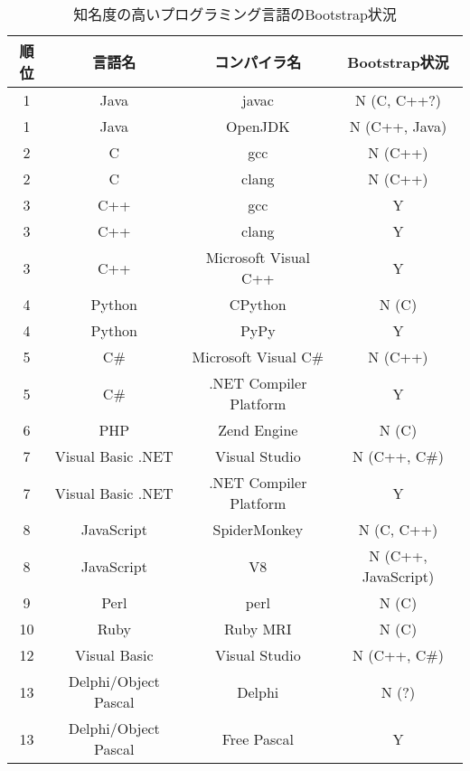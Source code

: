 \begin{table}[hb]
    \begin{center}
        \caption{知名度の高いプログラミング言語のBootstrap状況}
        \begin{tabular}{|c|c|c|c|}
            \hline
            順位 & 言語名 & コンパイラ名 & Bootstrap状況 \\
            \hline
            1 & Java & javac & N (C, C++?) \\
            \hline
            1 & Java & OpenJDK & N (C++, Java) \\
            \hline
            2 & C & gcc & N (C++) \\
            \hline
            2 & C & clang & N (C++) \\
            \hline
            3 & C++ & gcc & Y \\
            \hline
            3 & C++ & clang & Y \\
            \hline
            3 & C++ & Microsoft Visual C++ & Y \\
            \hline
            4 & Python & CPython & N (C) \\
            \hline
            4 & Python & PyPy & Y \\
            \hline
            5 & C\# & Microsoft Visual C\# & N (C++) \\
            \hline
            5 & C\# & .NET Compiler Platform & Y \\
            \hline
            6 & PHP & Zend Engine & N (C) \\
            \hline
            7 & Visual Basic .NET & Visual Studio & N (C++, C\#) \\
            \hline
            7 & Visual Basic .NET & .NET Compiler Platform & Y \\
            \hline
            8 & JavaScript & SpiderMonkey & N (C, C++) \\
            \hline
            8 & JavaScript & V8 & N (C++, JavaScript) \\
            \hline
            9 & Perl & perl & N (C) \\
            \hline
            10 & Ruby & Ruby MRI & N (C) \\
            \hline
            12 & Visual Basic & Visual Studio & N (C++, C\#) \\
            \hline
            13 & Delphi/Object Pascal & Delphi & N (?) \\
            \hline
            13 & Delphi/Object Pascal & Free Pascal & Y \\

\end{tabular}
\end{center}
\end{table}
